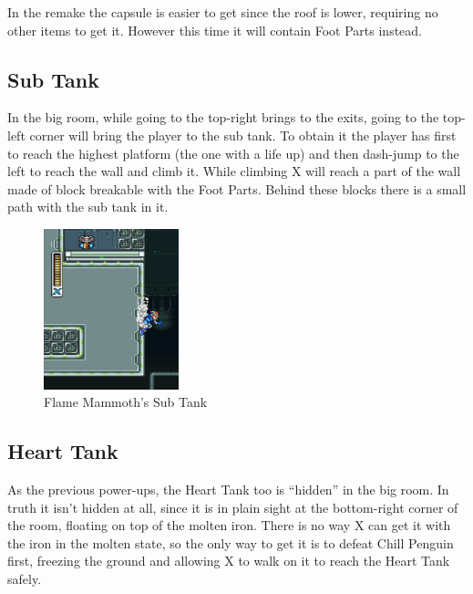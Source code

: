 In the \mhx remake the capsule is easier to get since the roof is lower, requiring no other items to get it. However this time it will contain Foot Parts instead.

\subsection{Sub Tank}
In the big room, while going to the top-right brings to the exits, going to the top-left corner will bring the player to the sub tank. To obtain it the player has first to reach the highest platform (the one with a life up) and then dash-jump to the left to reach the wall and climb it. While climbing X will reach a part of the wall made of block breakable with the Foot Parts. Behind these blocks there is a small path with the sub tank in it.
\begin{figure}[h]
	\centering
	\includegraphics[width=0.35\textwidth]{figures/X1/Flame_mammoth/Flame_tank.jpg}
	\caption{Flame Mammoth's Sub Tank}
\end{figure}



\subsection{Heart Tank}
As the previous power-ups, the Heart Tank too is ``hidden'' in the big room. In truth it isn't hidden at all, since it is in plain sight at the bottom-right corner of the room, floating on top of the molten iron. There is no way X can get it with the iron in the molten state, so the only way to get it is to defeat Chill Penguin first, freezing the ground and allowing X to walk on it to reach the Heart Tank safely.

